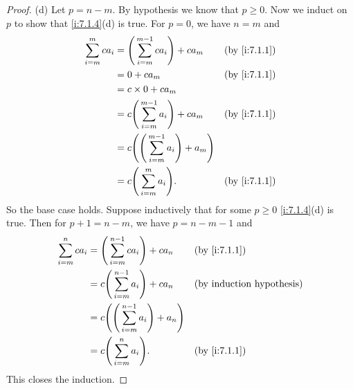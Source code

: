 \begin{proof}{(d)}
  Let \(p = n - m\).
  By hypothesis we know that \(p \geq 0\).
  Now we induct on \(p\) to show that \cref{i:7.1.4}(d) is true.
  For \(p = 0\), we have \(n = m\) and
  \begin{align*}
    \sum_{i = m}^m ca_i & = \Bigg(\sum_{i = m}^{m - 1} ca_i\Bigg) + ca_m             &  & \by{i:7.1.1} \\
                        & = 0 + ca_m                                                 &  & \by{i:7.1.1} \\
                        & = c \times 0 + ca_m                                                          \\
                        & = c \Bigg(\sum_{i = m}^{m - 1} a_i\Bigg) + ca_m            &  & \by{i:7.1.1} \\
                        & = c \Bigg(\Bigg(\sum_{i = m}^{m - 1} a_i\Bigg) + a_m\Bigg)                   \\
                        & = c \Bigg(\sum_{i = m}^m a_i\Bigg).                        &  & \by{i:7.1.1}
  \end{align*}
  So the base case holds.
  Suppose inductively that for some \(p \geq 0\) \cref{i:7.1.4}(d) is true.
  Then for \(p + 1 = n - m\), we have \(p = n - m - 1\) and
  \begin{align*}
    \sum_{i = m}^n ca_i & = \Bigg(\sum_{i = m}^{n - 1} ca_i\Bigg) + ca_n             &  & \by{i:7.1.1} \\
                        & = c \Bigg(\sum_{i = m}^{n - 1} a_i\Bigg) + ca_n            &  & \byIH        \\
                        & = c \Bigg(\Bigg(\sum_{i = m}^{n - 1} a_i\Bigg) + a_n\Bigg)                   \\
                        & = c \Bigg(\sum_{i = m}^n a_i\Bigg).                        &  & \by{i:7.1.1}
  \end{align*}
  This closes the induction.
\end{proof}

